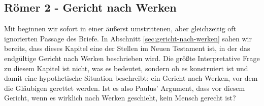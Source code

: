 \subsection{Römer 2 - Gericht nach Werken}
Mit  beginnen wir sofort in einer äußerst umstrittenen, aber gleichzeitig oft ignorierten Passage des Briefe.
In Abschnitt \ref{sec:gericht-nach-werken} sahen wir bereits, dass dieses Kapitel eine der Stellen im Neuen Testament ist, in der das endgültige Gericht
nach Werken beschrieben wird.
Die größte Interpretative Frage zu diesem Kapitel ist nicht, was es bedeutet, sondern ob es konstruiert ist und damit eine hypothetische Situation beschreibt:
ein Gericht nach Werken, vor dem die Gläubigen gerettet werden.
Ist es also  Paulus' Argument, dass vor diesem Gericht, wenn es wirklich nach Werken geschieht, kein Mensch gerecht ist?

